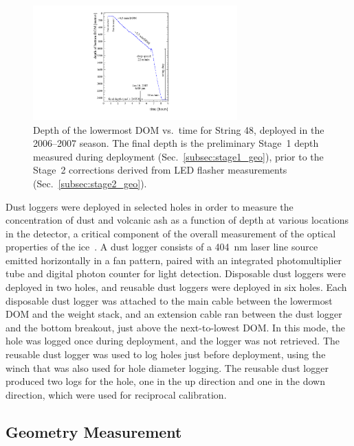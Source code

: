 \begin{figure}[!ht]
 \centering
 \includegraphics[width=0.70\textwidth]{graphics/drill/String48_deploy.pdf}
\caption{Depth of the lowermost DOM vs.~time for String 48, deployed in the
  2006--2007 season. The final depth is the preliminary Stage~1 depth
  measured during deployment (Sec.~\ref{subsec:stage1_geo}),
prior to the Stage~2 corrections derived from LED flasher
measurements (Sec.~\ref{subsec:stage2_geo}).}
\label{fig:deploytime}
\end{figure}

Dust loggers were deployed in selected holes in order to measure the
concentration of dust and volcanic ash as a function of depth at various
locations in the detector, a critical component of the overall measurement
of the optical properties of the
ice~\cite{Aartsen:2013rt,citeulike:2998650}. A dust logger consists of a 404~nm laser line source emitted horizontally in a
fan pattern, paired with an integrated
photomultiplier tube and digital photon counter for light
detection. Disposable dust loggers were deployed in two holes, and reusable dust loggers were
deployed in six holes. Each disposable dust
logger was attached to the main cable between the lowermost DOM and the
weight stack, and an extension cable ran between the dust logger and the
bottom breakout, just above the next-to-lowest DOM. In this mode, the hole
was logged once during deployment, and the logger was not
retrieved. The reusable dust logger was used to
log holes just before deployment, using the winch that was also used for
hole diameter logging. The reusable dust logger produced two logs for the
hole, one in the up direction and one in the down direction, which were used for
reciprocal calibration.


\subsection{Geometry Measurement}

